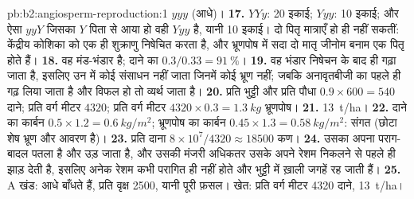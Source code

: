 \begin{solution}{pb:b2:angiosperm-reproduction:1}
$yyy$ (आधे)।
\textbf{17.} $YYy$: 20 इकाई; $Yyy$: 10 इकाई; और ऐसा $yyY$ जिसका $Y$ पिता
से आया हो वही  $Yyy$ है, यानी 10 इकाई। दो पितृ
मात्राएँ हो ही नहीं सकतीं: केंद्रीय कोशिका को एक ही शुक्राणु निषेचित करता
है, और भ्रूणपोष में सदा दो मातृ जीनोम बनाम एक पितृ होते हैं।
\textbf{18.} वह मंड-भंडार है; दाने का $0.3/0.33 = \qty{91}{\%}$।
\textbf{19.} वह भंडार निषेचन के बाद ही गढ़ा जाता है, इसलिए उन 
में कोई संसाधन नहीं जाता जिनमें कोई भ्रूण नहीं; जबकि अनावृतबीजी का
 पहले ही गढ़ लिया जाता है और  विफल हो तो व्यर्थ जाता है।
\textbf{20.} प्रति भुट्टी और प्रति पौधा $0.9\times 600 = 540$ दाने;
प्रति वर्ग मीटर $4320$; प्रति वर्ग मीटर $4320\times 0.3 = \qty{1.3}{kg}$
भ्रूणपोष।
\textbf{21.} \qty{13}{t/ha}।
\textbf{22.} दाने का कार्बन $0.5\times 1.2 = \qty{0.6}{kg/m^2}$;
भ्रूणपोष का कार्बन $0.45\times 1.3 = \qty{0.58}{kg/m^2}$: संगत
(छोटा शेष भ्रूण और आवरण है)।
\textbf{23.} प्रति दाना $8\times 10^{7}/4320 \approx \num{18500}$
कण।
\textbf{24.} उसका अपना पराग-बादल पतला है और उड़ जाता है, और उसकी
मंजरी अधिकतर उसके अपने रेशम निकलने से पहले ही झाड़ देती है, इसलिए अनेक
रेशम कभी परागित ही नहीं होते और भुट्टी में ख़ाली जगहें रह जाती हैं।
\textbf{25.} A खंड: आधे   बाँधते हैं, प्रति वृक्ष 2500, यानी
पूरी फ़सल। खेत: प्रति वर्ग मीटर 4320 दाने, \qty{13}{t/ha}।
\end{solution}
